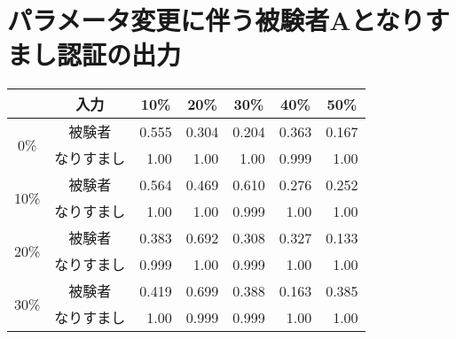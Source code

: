 \section{パラメータ変更に伴う被験者Aとなりすまし認証の出力\label{tune-a}}
\begin{center}
  \begin{longtable}[btph]{|c|c|r|r|r|r|r|}
    \hline
      \multicolumn{1}{|c|}{} & \multicolumn{1}{c|}{入力} & \multicolumn{1}{c|}{10\%} & \multicolumn{1}{c|}{20\%} & \multicolumn{1}{c|}{30\%} & \multicolumn{1}{c|}{40\%} & \multicolumn{1}{c|}{50\%} \\ \hline
      \multirow{2}{*}{0\%}  & 被験者 & 0.555 & 0.304 & 0.204 & 0.363 & 0.167 \\ \cline{2-7}
           & なりすまし & 1.00 & 1.00 & 1.00 & 0.999 & 1.00 \\ \hline
      \multirow{2}{*}{10\%} & 被験者 & 0.564 & 0.469 & 0.610 & 0.276 & 0.252 \\ \cline{2-7}
           & なりすまし & 1.00 & 1.00 & 0.999 & 1.00 & 1.00 \\ \hline
      \multirow{2}{*}{20\%} & 被験者 & 0.383 & 0.692 & 0.308 & 0.327 & 0.133 \\ \cline{2-7}
           & なりすまし & 0.999 & 1.00 & 0.999 & 1.00 & 1.00 \\ \hline
      \multirow{2}{*}{30\%} & 被験者 & 0.419 & 0.699 & 0.388 & 0.163 & 0.385 \\ \cline{2-7}
           & なりすまし & 1.00 & 0.999 & 0.999 & 1.00 & 1.00 \\ \hline

\end{longtable}
\end{center}
